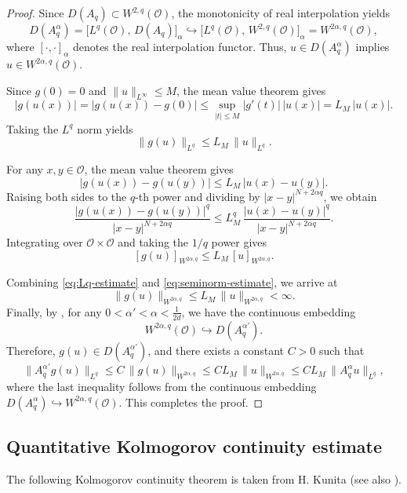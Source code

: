 \documentclass[10pt]{article}
\numberwithin{figure}{section}
\numberwithin{equation}{section}
\newcommand{\0}{{\theta}}
\begin{document}
\begin{proof}
Since $D(A_q)\subset W^{2,q}(\mathcal O)$, the monotonicity of real interpolation yields
$$
D(A_q^\alpha)
= \bigl[L^q(\mathcal O),\, D(A_q)\bigr]_\alpha
\hookrightarrow
\bigl[L^q(\mathcal O),\, W^{2,q}(\mathcal O)\bigr]_\alpha
= W^{2\alpha,q}(\mathcal O),
$$
where $[\cdot,\cdot]_\alpha$ denotes the real interpolation functor. 
Thus, $u \in D(A_q^\alpha)$ implies $u \in W^{2\alpha,q}(\mathcal O)$.

Since $g(0) = 0$ and $\|u\|_{L^\infty} \le M$, the mean value theorem gives
$$
|g(u(x))| = |g(u(x)) - g(0)|
\le \sup_{|t| \le M} |g'(t)|\,|u(x)|
= L_M\,|u(x)|.
$$
Taking the $L^q$ norm yields
\begin{equation}
\label{eq:Lq-estimate}
\|g(u)\|_{L^q}
\le L_M\,\|u\|_{L^q}.
\end{equation}

For any $x, y \in \mathcal O$, the mean value theorem gives
$$
|g(u(x)) - g(u(y))|
\le L_M\,|u(x) - u(y)|.
$$
Raising both sides to the $q$-th power and dividing by $|x - y|^{N + 2\alpha q}$, we obtain
$$
\frac{|g(u(x)) - g(u(y))|^q}{|x - y|^{N + 2\alpha q}}
\le L_M^q\,
\frac{|u(x) - u(y)|^q}{|x - y|^{N + 2\alpha q}}.
$$
Integrating over $\mathcal O \times \mathcal O$ and taking the $1/q$ power gives
\begin{equation}
\label{eq:seminorm-estimate}
[g(u)]_{W^{2\alpha, q}}
\le L_M\,[u]_{W^{2\alpha, q}}.
\end{equation}

Combining \eqref{eq:Lq-estimate} and \eqref{eq:seminorm-estimate}, we arrive at
$$
\|g(u)\|_{W^{2\alpha, q}}
\le L_M\,\|u\|_{W^{2\alpha, q}} < \infty.
$$
Finally, by \cite[Appendix~E, \S51.1]{QS}, for any $0 < \alpha' < \alpha < \frac{1}{2d}$, we have the continuous embedding
$$
W^{2\alpha, q}(\mathcal O) \hookrightarrow D(A_q^{\alpha'}).
$$
Therefore, $g(u) \in D(A_q^{\alpha'})$, and there exists a constant $C > 0$ such that
$$
\|A_q^{\alpha'} g(u)\|_{L^q}
\le C\,\|g(u)\|_{W^{2\alpha, q}}
\le CL_M\,\|u\|_{W^{2\alpha, q}}
\le CL_M\,\|A_q^\alpha u\|_{L^q},
$$
where the last inequality follows from the continuous embedding $D(A_q^\alpha) \hookrightarrow W^{2\alpha,q}(\mathcal O)$.
This completes the proof.
\end{proof}
\subsection{Quantitative Kolmogorov continuity estimate}

The following  Kolmogorov continuity theorem is taken from H. Kunita \cite{Kunita} (see also \cite{Stroock}).
\end{document}
